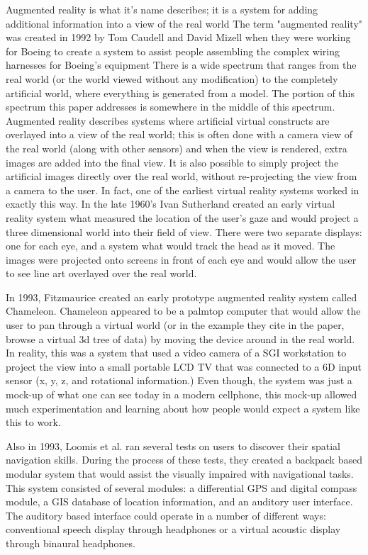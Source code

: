 \documentclass{acm_proc_article-sp}
\begin{document}
Augmented reality is what it's name describes; it is a system for adding additional information into a view of the real world \cite{mizell1994virtual} The term "augmented reality" was created in 1992 by Tom Caudell and David Mizell when they were working for Boeing to create a system to assist people assembling the complex wiring harnesses for Boeing's equipment \cite{citeulike:6081386} \cite{carmigniani2011augmented} There is a wide spectrum that ranges from the real world (or the world viewed without any modification) to the completely artificial world, where everything is generated from a model. \cite{milgram1994taxonomy} The portion of this spectrum this paper addresses is somewhere in the middle of this spectrum.   Augmented reality describes systems where artificial virtual constructs are overlayed into a view of the real world; this is often done with a camera view of the real world (along with other sensors) and when the view is rendered, extra images are added into the final view.  It is also possible to simply project the artificial images directly over the real world, without re-projecting the view from a camera to the user.  In fact, one of the earliest virtual reality systems worked in exactly this way.  In the late 1960's  Ivan Sutherland created an early virtual reality system what measured the location of the user's gaze and would project a three dimensional world into their field of view.  There were two separate displays: one for each eye, and a system what would track the head as it moved.  The images were projected onto screens in front of each eye and would allow the user to see line art overlayed over the real world. \cite{Sutherland:1968:HTD:1476589.1476686}



In 1993, Fitzmaurice created an early prototype augmented reality system called Chameleon.  Chameleon appeared to be a palmtop computer that would allow the user to pan through a virtual world (or in the example they cite in the paper, browse a virtual 3d tree of data) by moving the device around in the real world.  In reality, this was a system that used a video camera of a SGI workstation to project the view into a small portable LCD TV that was connected to a 6D input sensor (x, y, z, and rotational information.)  Even though, the system was just a mock-up of what one can see today in a modern cellphone, this mock-up allowed much experimentation and learning about how people would expect a system like this to work.\cite{fitzmaurice1993situated}

Also in 1993, Loomis et al. ran several tests on users to discover their spatial navigation skills.  \cite{loomis1993nonvisual} During the process of these tests, they created a backpack based modular system that would assist the visually impaired with navigational tasks.  This system consisted of several modules: a differential GPS and digital compass module, a GIS database of location information, and an auditory user interface.  The auditory based interface could operate in a number of different ways: conventional speech display through headphones or a virtual acoustic display through binaural headphones. \cite{loomis1994personal}
\end{document}
